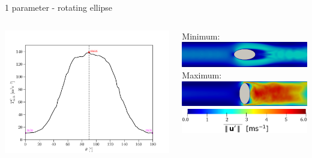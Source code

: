 \documentclass[aspectratio=169,xcolor=dvipsnames]{beamer}
\begin{document}
\begin{frame}{1 parameter - rotating ellipse}
	\addtocounter{framenumber}{-1}
	\begin{columns}
		\begin{column}{.56\textwidth}
			\includegraphics[width=1\linewidth, trim={0 0 0 0}, clip]{Images/elip1interpolated.pdf}			
		\end{column}
		\begin{column}{.52\textwidth}
			Minimum:\\[4pt]
			\includegraphics[width=0.9\linewidth, trim={0 0 0 0}, clip]{Images/ellipse1_min_a.png}
			\\ \vspace{2mm}
			Maximum:\\[4pt]	
			\includegraphics[width=0.9\linewidth, trim={0 0 0 0}, clip]{Images/ellipse1_max_a.png}
			\\ \vspace{4mm}		
			\centering
			\hspace{-6mm}\includegraphics[width=0.6\linewidth, trim={0 0 0 0}, clip]{Images/ellipse12_legenda.png}
		\end{column}
	\end{columns}
\end{frame}
\end{document}
